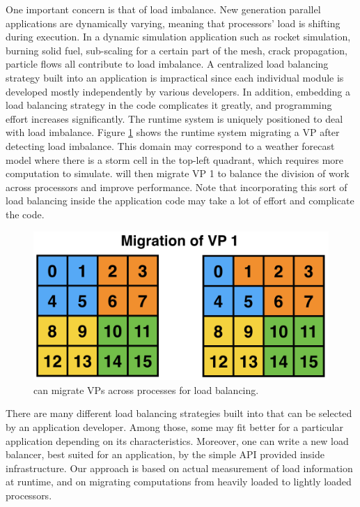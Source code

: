 \documentclass[10pt]{article}
\begin{document}
One important concern is that of load imbalance. New generation parallel
applications are dynamically varying, meaning that processors' load is
shifting during execution. In a dynamic simulation application such as
rocket simulation, burning solid fuel, sub-scaling for a certain part of
the mesh, crack propagation, particle flows all contribute to load imbalance.
A centralized load balancing strategy built into an application is
impractical since each individual module is developed mostly independently by
various developers. In addition, embedding a load balancing strategy in the code
complicates it greatly, and programming effort increases significantly. The
runtime system is uniquely positioned to deal with load imbalance. Figure
\ref{fig_migrate} shows the runtime system migrating a VP after detecting
load imbalance. This domain may correspond to a weather forecast model
where there is a storm cell in the top-left quadrant, which requires more
computation to simulate. \ampi{} will then migrate VP 1 to balance the
division of work across processors and improve performance. Note that
incorporating this sort of load balancing inside the application code may
take a lot of effort and complicate the code.

\begin{figure}[h]
\centering
\includegraphics[width=4.6in]{figs/migrate.png}
\caption{\ampi{} can migrate VPs across processes for load balancing.}
\label{fig_migrate}
\end{figure}

There are many different load balancing strategies built into \charmpp{} that
can be selected by an \ampi{} application developer. Among those, some may
fit better for a particular application depending on its characteristics.
Moreover, one can write a new load balancer, best suited for an application,
by the simple API provided inside \charmpp{} infrastructure.
Our approach is based on actual measurement of load information at runtime,
and on migrating computations from heavily loaded to lightly loaded processors.
\end{document}
